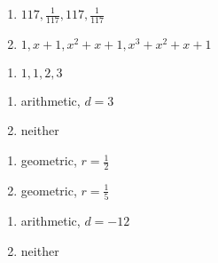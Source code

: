 \documentclass{ximera}
\begin{document}
\begin{multicols}{2}
\begin{enumerate}
\setcounter{enumi}{\value{HW}}

\item $117, \frac{1}{117}, 117, \frac{1}{117}$
\item $1, x + 1, x^{2} + x + 1, x^{3} + x^{2} + x + 1 $

\setcounter{HW}{\value{enumi}}
\end{enumerate}
\end{multicols}

\begin{multicols}{2}
\begin{enumerate}
\setcounter{enumi}{\value{HW}}

\item $1, 1, 2, 3$

\setcounter{HW}{\value{enumi}}
\end{enumerate}
\end{multicols}

\begin{multicols}{2}
\begin{enumerate}
\setcounter{enumi}{\value{HW}}

\item  arithmetic, $d = 3$

\item  neither


\setcounter{HW}{\value{enumi}}
\end{enumerate}
\end{multicols}

\begin{multicols}{2}
\begin{enumerate}
\setcounter{enumi}{\value{HW}}

\item  geometric, $r = \frac{1}{2}$

\item  geometric, $r = \frac{1}{5}$

\setcounter{HW}{\value{enumi}}
\end{enumerate}
\end{multicols}

\begin{multicols}{2}
\begin{enumerate}
\setcounter{enumi}{\value{HW}}


\item  arithmetic, $d = -12$

\item  neither

\setcounter{HW}{\value{enumi}}
\end{enumerate}
\end{multicols}
\end{document}
